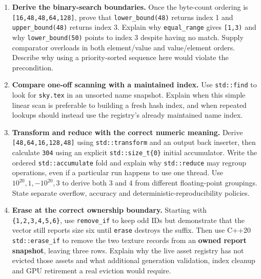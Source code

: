 \begin{enumerate}
  \textbf{Partition only when the task is binary membership.} Use \texttt{std::partition} to put mesh records before non-mesh records; verify both halves and use \texttt{partition\_point} on the resulting already-partitioned range. Explain why the two groups are not automatically sorted and why partitioning does not promise to retain original relative order. Say when \texttt{stable\_partition} would be appropriate.
\item
  \textbf{Derive the binary-search boundaries.} Once the byte-count ordering is \texttt{{[}16,48,48,64,128{]}}, prove that \texttt{lower\_bound(48)} returns index 1 and \texttt{upper\_bound(48)} returns index 3. Explain why \texttt{equal\_range} gives \texttt{{[}1,3)} and why \texttt{lower\_bound(50)} points to index 3 despite having no match. Supply comparator overloads in both element/value and value/element orders. Describe why using a priority-sorted sequence here would violate the precondition.
\item
  \textbf{Compare one-off scanning with a maintained index.} Use \texttt{std::find} to look for \texttt{sky.tex} in an unsorted name snapshot. Explain when this simple linear scan is preferable to building a fresh hash index, and when repeated lookups should instead use the registry's already maintained name index.
\item
  \textbf{Transform and reduce with the correct numeric meaning.} Derive \texttt{{[}48,64,16,128,48{]}} using \texttt{std::transform} and an output back inserter, then calculate \texttt{304} using an explicit \texttt{std::size\_t\{0\}} initial accumulator. Write the ordered \texttt{std::accumulate} fold and explain why \texttt{std::reduce} may regroup operations, even if a particular run happens to use one thread. Use \(10^{20},1,-10^{20},3\) to derive both 3 and 4 from different floating-point groupings. State separate overflow, accuracy and deterministic-reproducibility policies.
\item
  \textbf{Erase at the correct ownership boundary.} Starting with \texttt{\{1,2,3,4,5,6\}}, use \texttt{remove\_if} to keep odd IDs but demonstrate that the vector still reports size six until \texttt{erase} destroys the suffix. Then use C++20 \texttt{std::erase\_if} to remove the two texture records from an \textbf{owned report snapshot}, leaving three rows. Explain why the live asset registry has not evicted those assets and what additional generation validation, index cleanup and GPU retirement a real eviction would require.
\end{enumerate}

